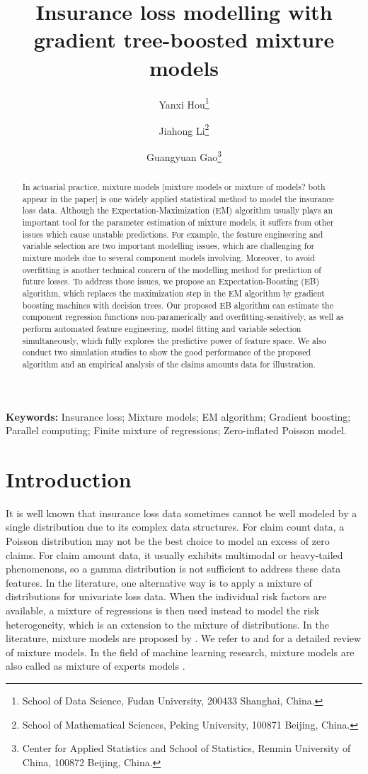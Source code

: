 \documentclass[11pt]{article}
\title{Insurance loss modelling with gradient tree-boosted mixture models}
\author{ Yanxi Hou\footnote{School of Data Science, Fudan University, 200433 Shanghai, China.} \and Jiahong Li\footnote{School of Mathematical Sciences, Peking University, 100871 Beijing, China.} \and Guangyuan Gao\footnote{Center for Applied Statistics and School of Statistics, Renmin University of China, 100872 Beijing, China.}}
\numberwithin{equation}{section}
\begin{document}
\maketitle

\begin{abstract}
\noindent 
In actuarial practice, mixture models {\color{blue}[mixture models or mixture of models? both appear in the paper]} is one widely applied statistical method to model the insurance loss data. 
Although the Expectation-Maximization (EM) algorithm usually plays an important tool for the parameter estimation of mixture  models, it suffers from other issues which cause unstable predictions. 
For example, the feature engineering and variable selection are two important modelling issues, which are challenging for mixture models due to several component models involving. 
Moreover, to avoid overfitting is another technical concern of the modelling method for prediction of future losses. 
To address those issues, we propose an Expectation-Boosting (EB) algorithm, 
which replaces the maximization step in the EM algorithm by gradient boosting machines with decision trees. 
Our proposed EB algorithm can estimate the component regression functions non-paramerically and overfitting-sensitively, as well as
perform automated feature engineering, model fitting and variable selection simultaneously, which
fully explores the predictive power of feature space.
We also conduct two simulation studies to show the good performance of the proposed algorithm and an empirical analysis of the claims amounts data for illustration. 

\end{abstract}

{\bf Keywords:} Insurance loss; Mixture models; EM algorithm; Gradient boosting; Parallel computing; Finite mixture of regressions; Zero-inflated Poisson model. 


\section{Introduction}

It is well known that insurance loss data sometimes cannot be well modeled by a single distribution due to its complex data structures.
For claim count data, a Poisson distribution may not be the best choice to model an excess of zero claims.
For claim amount data, it usually exhibits multimodal or heavy-tailed phenomenons, so a gamma distribution is not sufficient to address these data features.
In the literature, one alternative way is to apply a mixture of distributions for univariate loss data.
When the individual risk factors are available, a mixture of regressions is then used instead to model the risk heterogeneity, which is an extension to the mixture of distributions. 
In the literature,
mixture models are proposed by \citet{goldfeld1973markov}.
We refer to \citet{lindsay1995mixture} and \citet{peel2000finite} for a detailed review of mixture models.
In the field of machine learning research, mixture models are also called as mixture of experts models \citep{jacobs1991adaptive,jiang1999hierarchical}.
\end{document}
